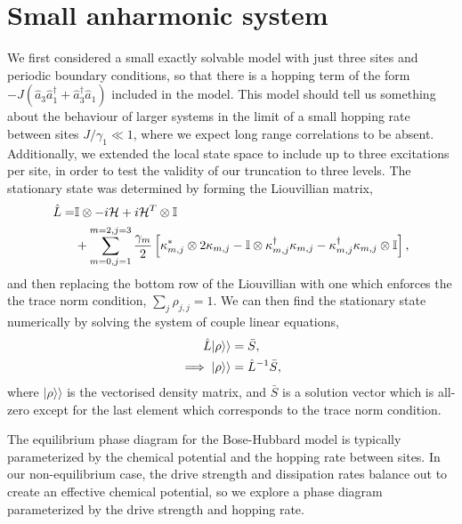 \section{Small anharmonic system}

We first considered a small exactly solvable model with just three sites and periodic boundary conditions, so that there is a hopping term of the form \(-J(\hat{a}_{3}\hat{a}_{1}^{\dagger} + \hat{a}_{3}^{\dagger}\hat{a}_{1})\) included in the model. This model should tell us something about the behaviour of larger systems in the limit of a small hopping rate between sites \(J / \gamma_{1} \ll 1\), where we expect long range correlations to be absent. Additionally, we extended the local state space to include up to three excitations per site, in order to test the validity of our truncation to three levels. The stationary state was determined by forming the Liouvillian matrix,
\begin{align}
	\hat{L} = &\mathbb{I} \otimes -i\mathcal{H} + i\mathcal{H}^{T} \otimes \mathbb{I} \notag \\ 
	&+ \sum_{m=0,j=1}^{m=2,j=3}\frac{\gamma_{m}}{2}\left[ \kappa_{m,j}^{*} \otimes 2\kappa_{m,j} - \mathbb{I} \otimes \kappa_{m,j}^{\dagger}\kappa_{m,j} - \kappa_{m,j}^{\dagger}\kappa_{m,j} \otimes \mathbb{I}\right],
	\label{eq:dnlca3-1}
\end{align}
and then replacing the bottom row of the Liouvillian with one which enforces the the trace norm condition, \(\sum_{j} \rho_{j,j} = 1\). We can then find the stationary state numerically by solving the system of couple linear equations,
\begin{align}
	 \hat{L}|\rho \rangle \rangle &= \bar{S}, \notag \\
	 \implies |\rho \rangle \rangle &= \hat{L}^{-1}\bar{S},
	 \label{eq:dnlca3-2}
\end{align}
where \(|\rho\rangle\rangle\) is the vectorised density matrix, and \(\bar{S}\) is a solution vector which is all-zero except for the last element which corresponds to the trace norm condition.

The equilibrium phase diagram for the Bose-Hubbard model is typically parameterized by the chemical potential and the hopping rate between sites. In our non-equilibrium case, the drive strength and dissipation rates balance out to create an effective chemical potential, so we explore a phase diagram parameterized by the drive strength and hopping rate. 

